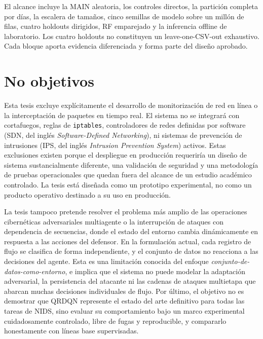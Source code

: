 El alcance incluye la MAIN aleatoria, los controles directos, la partición completa por días, la escalera de tamaños, cinco semillas de modelo sobre un millón de filas, cuatro holdouts dirigidos, RF emparejado y la inferencia offline de laboratorio. Los cuatro holdouts no constituyen un leave-one-CSV-out exhaustivo. Cada bloque aporta evidencia diferenciada y forma parte del diseño aprobado.

\section{No objetivos}
Esta tesis excluye explícitamente el desarrollo de monitorización de red en línea o la interceptación de paquetes en tiempo real. El sistema no se integrará con cortafuegos, reglas de \texttt{iptables}, controladores de redes definidas por software (SDN, del inglés \emph{Software-Defined Networking}), ni sistemas de prevención de intrusiones (IPS, del inglés \emph{Intrusion Prevention System}) activos. Estas exclusiones existen porque el despliegue en producción requeriría un diseño de sistema sustancialmente diferente, una validación de seguridad y una metodología de pruebas operacionales que quedan fuera del alcance de un estudio académico controlado. La tesis está diseñada como un prototipo experimental, no como un producto operativo destinado a su uso en producción.

La tesis tampoco pretende resolver el problema más amplio de las operaciones cibernéticas adversariales multiagente o la interrupción de ataques con dependencia de secuencias, donde el estado del entorno cambia dinámicamente en respuesta a las acciones del defensor. En la formulación actual, cada registro de flujo se clasifica de forma independiente, y el conjunto de datos no reacciona a las decisiones del agente. Esta es una limitación conocida del enfoque \textit{conjunto-de-datos-como-entorno}, e implica que el sistema no puede modelar la adaptación adversarial, la persistencia del atacante ni las cadenas de ataques multietapa que abarcan muchas decisiones individuales de flujo. Por último, el objetivo no es demostrar que QRDQN represente el estado del arte definitivo para todas las tareas de NIDS, sino evaluar su comportamiento bajo un marco experimental cuidadosamente controlado, libre de fugas y reproducible, y compararlo honestamente con líneas base supervisadas.


